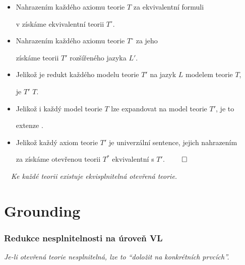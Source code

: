     \begin{itemize}
    \item Nahrazením každého axiomu teorie $T$ za ekvivalentní formuli
    \vspace{0.5mm}
    
    v  získáme ekvivalentní teorii $T^\circ$.
    \vspace{0.5mm}
    
    \item Nahrazením každého axiomu teorie $T^\circ$ za jeho 
    \vspace{0.5mm}
    
    získáme teorii $T'$ rozšířeného jazyka $L'$.
    \vspace{0.5mm}
    
    \item Jelikož je redukt každého modelu teorie $T'$ na jazyk $L$ modelem teorie $T$,
    \vspace{0.5mm}
    
    je $T'$  $T$.
    \vspace{0.5mm}
    
    \item Jelikož i každý model teorie $T$ lze expandovat na model teorie $T'$, je to
    \vspace{0.5mm}
    
    extenze .
    \vspace{0.5mm}
    
    \item Jelikož každý axiom teorie $T'$ je univerzální sentence, jejich nahrazením
    \vspace{0.5mm}
    
    za  získáme otevřenou teorii $T^*$ ekvivalentní s $T'$. $\qed$
    \end{itemize}
    \medskip
    
    {\bf {}}\ \ {\it Ke každé teorii existuje ekvisplnitelná otevřená teorie.}
    
    


\section{Grounding}\todo

\subsubsection*{Redukce nesplnitelnosti na úroveň VL}
    {\it Je-li otevřená teorie nesplnitelná, lze to ``doložit na konkrétních prvcích''.}
    \medskip
    
